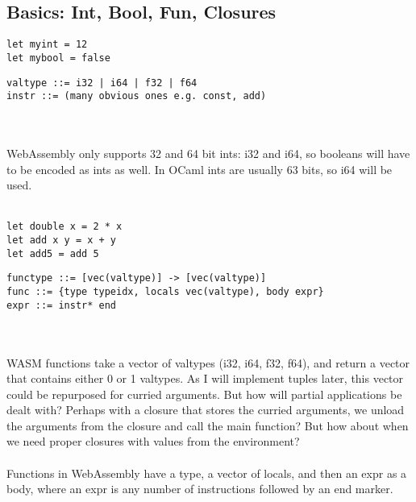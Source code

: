 \documentclass{article}
\begin{document}
\subsection{Basics: Int, Bool, Fun, Closures}
\begin{minipage}{0.4\linewidth}
\begin{verbatim}
let myint = 12
let mybool = false
\end{verbatim}
\end{minipage}
\begin{minipage}{0.6\linewidth}
\begin{verbatim}
valtype ::= i32 | i64 | f32 | f64
instr ::= (many obvious ones e.g. const, add)
\end{verbatim}
\end{minipage}
\\\\
WebAssembly only supports 32 and 64 bit ints: i32 and i64, so booleans will have to be encoded as ints as well. In OCaml ints are usually 63 bits, so i64 will be used.
\\\\
\begin{minipage}{0.4\linewidth}
\begin{verbatim}
let double x = 2 * x
let add x y = x + y
let add5 = add 5
\end{verbatim}
\end{minipage}
\begin{minipage}{0.6\linewidth}
\begin{verbatim}
functype ::= [vec(valtype)] -> [vec(valtype)]
func ::= {type typeidx, locals vec(valtype), body expr}
expr ::= instr* end
\end{verbatim}
\end{minipage}
\\\\
WASM functions take a vector of valtypes (i32, i64, f32, f64), and return a vector that contains either 0 or 1 valtypes. As I will implement tuples later, this vector could be repurposed for curried arguments. But how will partial applications be dealt with? Perhaps with a closure that stores the curried arguments, we unload the arguments from the closure and call the main function? But how about when we need proper closures with values from the environment?
\\\\
Functions in WebAssembly have a type, a vector of locals, and then an expr as a body, where an expr is any number of instructions followed by an end marker.
\end{document}
